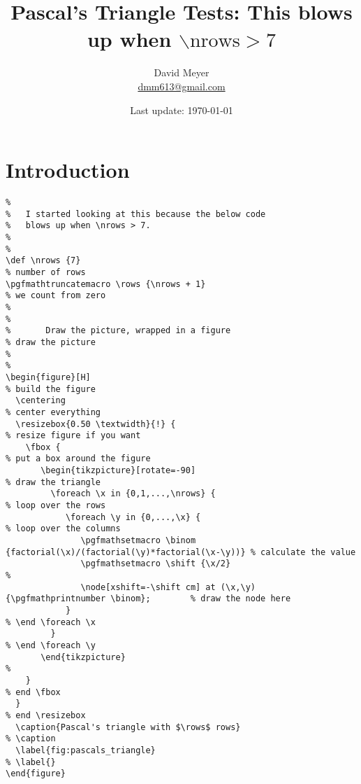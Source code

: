 \documentclass{article}
\title{Pascal's Triangle Tests: This blows up when $\backslash\text{nrows} > 7$}
\author{David Meyer \\ \href{mailto:dmm613@gmail.com}
                            {dmm613@gmail.com}}
\date{Last update: \today}
\theoremstyle{definition}
\begin{document}
\maketitle
%
%
%
\section{Introduction}
\label{sec:introduction}

{\footnotesize
\begin{verbatim}
%
%	I started looking at this because the below code
%	blows up when \nrows > 7.
%
%
\def \nrows {7}                                                                         % number of rows
\pgfmathtruncatemacro \rows {\nrows + 1}                                                % we count from zero
%                                                                                       %
%       Draw the picture, wrapped in a figure                                           % draw the picture
%                                                                                       %
\begin{figure}[H]                                                                       % build the figure
  \centering                                                                            % center everything
  \resizebox{0.50 \textwidth}{!} {                                                      % resize figure if you want
    \fbox {                                                                             % put a box around the figure
       \begin{tikzpicture}[rotate=-90]                                                  % draw the triangle
         \foreach \x in {0,1,...,\nrows} {                                              % loop over the rows
            \foreach \y in {0,...,\x} {                                                 % loop over the columns
               \pgfmathsetmacro \binom {factorial(\x)/(factorial(\y)*factorial(\x-\y))}	% calculate the value
               \pgfmathsetmacro \shift {\x/2}                                          	%
               \node[xshift=-\shift cm] at (\x,\y) {\pgfmathprintnumber \binom};        % draw the node here
            }                                                                           % \end \foreach \x
         }                                                                              % \end \foreach \y
       \end{tikzpicture}                                                                %
    }                                                                                   % end \fbox
  }                                                                                     % end \resizebox
  \caption{Pascal's triangle with $\rows$ rows}                                         % \caption
  \label{fig:pascals_triangle}                                                          % \label{}
\end{figure}
\end{verbatim}
}
\end{document}
